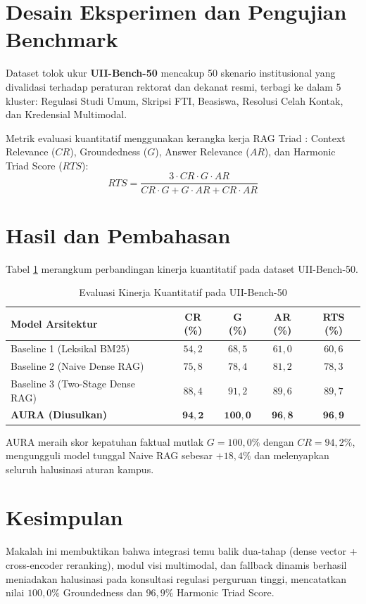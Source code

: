 \documentclass[conference]{IEEEtran}
\begin{document}
\section{Desain Eksperimen dan Pengujian Benchmark}
Dataset tolok ukur \textbf{UII-Bench-50} mencakup 50 skenario institusional yang divalidasi terhadap peraturan rektorat dan dekanat resmi, terbagi ke dalam 5 kluster: Regulasi Studi Umum, Skripsi FTI, Beasiswa, Resolusi Celah Kontak, dan Kredensial Multimodal.

Metrik evaluasi kuantitatif menggunakan kerangka kerja RAG Triad \cite{es2023ragas}: Context Relevance ($CR$), Groundedness ($G$), Answer Relevance ($AR$), dan Harmonic Triad Score ($RTS$):
\begin{equation}
RTS = \frac{3 \cdot CR \cdot G \cdot AR}{CR \cdot G + G \cdot AR + CR \cdot AR}
\end{equation}

\section{Hasil dan Pembahasan}
Tabel \ref{tab:evaluasi} merangkum perbandingan kinerja kuantitatif pada dataset UII-Bench-50.

\begin{table}[htbp]
\caption{Evaluasi Kinerja Kuantitatif pada UII-Bench-50}
\begin{center}
\begin{tabular}{lcccc}
\toprule
\textbf{Model Arsitektur} & \textbf{CR (\%)} & \textbf{G (\%)} & \textbf{AR (\%)} & \textbf{RTS (\%)} \\
\midrule
Baseline 1 (Leksikal BM25) & $54{,}2$ & $68{,}5$ & $61{,}0$ & $60{,}6$ \\
Baseline 2 (Naive Dense RAG) & $75{,}8$ & $78{,}4$ & $81{,}2$ & $78{,}3$ \\
Baseline 3 (Two-Stage Dense RAG) & $88{,}4$ & $91{,}2$ & $89{,}6$ & $89{,}7$ \\
\textbf{AURA (Diusulkan)} & $\mathbf{94{,}2}$ & $\mathbf{100{,}0}$ & $\mathbf{96{,}8}$ & $\mathbf{96{,}9}$ \\
\bottomrule
\end{tabular}
\label{tab:evaluasi}
\end{center}
\end{table}

AURA meraih skor kepatuhan faktual mutlak $G = 100{,}0\%$ dengan $CR = 94{,}2\%$, mengungguli model tunggal Naive RAG sebesar $+18{,}4\%$ dan melenyapkan seluruh halusinasi aturan kampus.

\section{Kesimpulan}
Makalah ini membuktikan bahwa integrasi temu balik dua-tahap (dense vector + cross-encoder reranking), modul visi multimodal, dan fallback dinamis berhasil meniadakan halusinasi pada konsultasi regulasi perguruan tinggi, mencatatkan nilai $100{,}0\%$ Groundedness dan $96{,}9\%$ Harmonic Triad Score.



\end{document}
